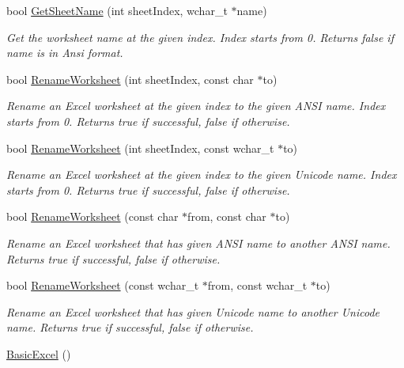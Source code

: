 \begin{DoxyCompactItemize}
bool \hyperlink{class_y_excel_1_1_basic_excel_ac7ccde7ac55faac583344be0bd17d45d}{Get\+Sheet\+Name} (int sheet\+Index, wchar\+\_\+t $\ast$name)
\begin{DoxyCompactList}\small\item\em Get the worksheet name at the given index. Index starts from 0. Returns false if name is in Ansi format. \end{DoxyCompactList}\item 
bool \hyperlink{class_y_excel_1_1_basic_excel_a3d5ec534c692b5db5497a635f068497e}{Rename\+Worksheet} (int sheet\+Index, const char $\ast$to)
\begin{DoxyCompactList}\small\item\em Rename an Excel worksheet at the given index to the given A\+N\+S\+I name. Index starts from 0. Returns true if successful, false if otherwise. \end{DoxyCompactList}\item 
bool \hyperlink{class_y_excel_1_1_basic_excel_a56fe58032e4e985a69f66a61295dbbe0}{Rename\+Worksheet} (int sheet\+Index, const wchar\+\_\+t $\ast$to)
\begin{DoxyCompactList}\small\item\em Rename an Excel worksheet at the given index to the given Unicode name. Index starts from 0. Returns true if successful, false if otherwise. \end{DoxyCompactList}\item 
bool \hyperlink{class_y_excel_1_1_basic_excel_a791f06c754f67e2e010052f65a7f4651}{Rename\+Worksheet} (const char $\ast$from, const char $\ast$to)
\begin{DoxyCompactList}\small\item\em Rename an Excel worksheet that has given A\+N\+S\+I name to another A\+N\+S\+I name. Returns true if successful, false if otherwise. \end{DoxyCompactList}\item 
bool \hyperlink{class_y_excel_1_1_basic_excel_a63323de30c5e426f225d57dac5f243ff}{Rename\+Worksheet} (const wchar\+\_\+t $\ast$from, const wchar\+\_\+t $\ast$to)
\begin{DoxyCompactList}\small\item\em Rename an Excel worksheet that has given Unicode name to another Unicode name. Returns true if successful, false if otherwise. \end{DoxyCompactList}\item 
\hyperlink{class_y_excel_1_1_basic_excel_ad2cb116dc96aa380399de4c1d0a93eb7}{Basic\+Excel} ()

\end{DoxyCompactItemize}
